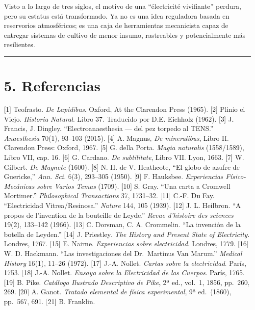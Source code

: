 \documentclass[
  11pt,
  letterpaper,
]{article}
\begin{document}
Visto a lo largo de tres siglos, el motivo de una ``électricité
vivifiante'' perdura, pero su estatus está transformado. Ya no es una
idea reguladora basada en reservorios atmosféricos; es una caja de
herramientas mecanicista capaz de entregar sistemas de cultivo de menor
insumo, rastreables y potencialmente más resilientes.

\begin{center}\rule{0.5\linewidth}{0.5pt}\end{center}

\section{5. Referencias}\label{referencias}

{[}1{]} Teofrasto. \emph{De Lapidibus}. Oxford, At the Clarendon Press
(1965). {[}2{]} Plinio el Viejo. \emph{Historia Natural}. Libro 37.
Traducido por D.E. Eichholz (1962). {[}3{]} J. Francis, J. Dingley.
``Electroanaesthesia --- del pez torpedo al TENS.'' \emph{Anaesthesia}
70(1), 93--103 (2015). {[}4{]} A. Magnus, \emph{De mineralibus}, Libro
II. Clarendon Press: Oxford, 1967. {[}5{]} G. della Porta. \emph{Magia
naturalis} (1558/1589), Libro VII, cap. 16. {[}6{]} G. Cardano. \emph{De
subtilitate}, Libro VII. Lyon, 1663. {[}7{]} W. Gilbert. \emph{De
Magnete} (1600). {[}8{]} N. H. de V. Heathcote, ``El globo de azufre de
Guericke,'' \emph{Ann. Sci.} 6(3), 293--305 (1950). {[}9{]} F. Hauksbee.
\emph{Experiencias Físico-Mecánicas sobre Varios Temas} (1709). {[}10{]}
S. Gray. ``Una carta a Cromwell Mortimer.'' \emph{Philosophical
Transactions} 37, 1731--32. {[}11{]} C.-F. Du Fay. ``Electricidad
Vitrea/Resinosa.'' \emph{Nature} 144, 105 (1939). {[}12{]} J. L.
Heilbron. ``A propos de l'invention de la bouteille de Leyde.''
\emph{Revue d'histoire des sciences} 19(2), 133--142 (1966). {[}13{]} C.
Dorsman, C. A. Crommelin. ``La invención de la botella de Leyden.''
{[}14{]} J. Priestley. \emph{The History and Present State of
Electricity}. Londres, 1767. {[}15{]} E. Nairne. \emph{Experiencias
sobre electricidad}. Londres, 1779. {[}16{]} W. D. Hackmann. ``Las
investigaciones del Dr.~Martinus Van Marum.'' \emph{Medical History}
16(1), 11--26 (1972). {[}17{]} J.-A. Nollet. \emph{Cartas sobre la
electricidad}. París, 1753. {[}18{]} J.-A. Nollet. \emph{Ensayo sobre la
Electricidad de los Cuerpos}. París, 1765. {[}19{]} B. Pike.
\emph{Catálogo Ilustrado Descriptivo de Pike}, 2ª ed., vol.~1, 1856,
pp.~260, 269. {[}20{]} A. Ganot. \emph{Tratado elemental de física
experimental}, 9ª ed.~(1860), pp.~567, 691. {[}21{]} B. Franklin.
\end{document}
